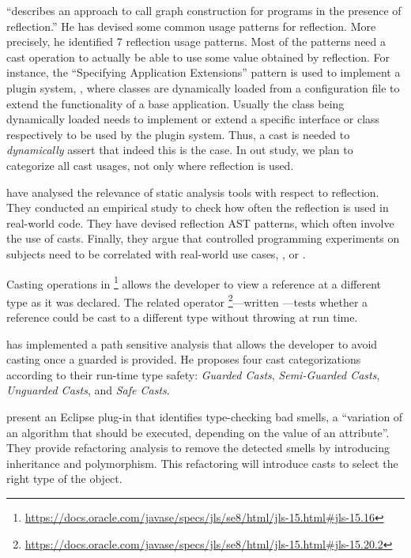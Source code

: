 \cite{livshitsImprovingSoftwareSecurity2006,livshitsReflectionAnalysisJava2005} ``describes an approach to call graph construction for \java{} programs in the presence of reflection.''
He has devised some common usage patterns for reflection.
More precisely, he identified 7 reflection usage patterns.
Most of the patterns need a cast operation to actually be able to use some value obtained by reflection.
For instance,
the ``Specifying Application Extensions'' pattern is used to implement a plugin system,
\ie, where classes are dynamically loaded from a configuration file to extend the functionality of a base application.
Usually the class being dynamically loaded needs to implement or extend a specific interface or class respectively to be used by the plugin system.
Thus, a cast is needed to \emph{dynamically} assert that indeed this is the case.
In out study, we plan to categorize all cast usages, not only where reflection is used.

\cite{landmanChallengesStaticAnalysis2017} have analysed the relevance of
static analysis tools with respect to reflection.
They conducted an empirical study to check how often the reflection
\api{} is used in real-world code.
They have devised reflection AST patterns,
which often involve the use of casts.
Finally, they argue that controlled programming experiments on
subjects need to be correlated with real-world use cases,
\eg, \github{} or \mavencentral{}.

Casting operations in \java{}%
\footnote{\url{https://docs.oracle.com/javase/specs/jls/se8/html/jls-15.html\#jls-15.16}}
allows the developer to view a reference at a different type as it was declared.
The related  operator%
\footnote{\url{https://docs.oracle.com/javase/specs/jls/se8/html/jls-15.html\#jls-15.20.2}}---written ---tests whether a reference  could be cast to a different type  without
throwing  at run time.

\cite{wintherGuardedTypePromotion2011} has implemented a
path sensitive analysis that allows the developer to avoid casting
once a guarded  is provided.
He proposes four cast categorizations according to their
run-time type safety:
\emph{Guarded Casts}, \emph{Semi-Guarded Casts},
\emph{Unguarded Casts}, and \emph{Safe Casts}.

\cite{tsantalisJDeodorantIdentificationRemoval2008} present an
Eclipse plug-in that identifies type-checking bad smells,
a ``variation of an algorithm that should be executed,
depending on the value of an attribute''.
They provide refactoring analysis to remove the detected smells
by introducing inheritance and polymorphism.
This refactoring will introduce casts to select
the right type of the object.

